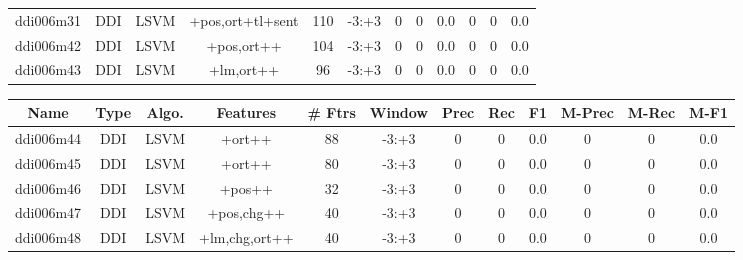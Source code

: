 \documentclass[a4paper]{article}
\begin{document}
\begin{landscape}
\begin{center}
\begin{tabular}{ |c|c|c|c|c|c|c|c|c|c|c|c|}
 
 	
 	\small{ ddi006m31 } & \small{ DDI} & \small{  LSVM }  & +pos,ort+tl+sent  &  110 &  \small{  -3:+3 }  &  0 & 0 & 0.0  &  0 & 0 & 0.0 \\
 	

 
 	
 	\small{ ddi006m42 } & \small{ DDI} & \small{  LSVM }  & +pos,ort++  &  104 &  \small{  -3:+3 }  &  0 & 0 & 0.0  &  0 & 0 & 0.0 \\
 	

 
 	
 	\small{ ddi006m43 } & \small{ DDI} & \small{  LSVM }  & +lm,ort++  &  96 &  \small{  -3:+3 }  &  0 & 0 & 0.0  &  0 & 0 & 0.0 \\
 	
 \hline
\end{tabular}
\end{center}




\begin{center}
\begin{tabular}{ |c|c|c|c|c|c|c|c|c|c|c|c|} 
 \hline
 	Name & Type & Algo. & Features & \# Ftrs & Window & Prec & Rec & F1 & M-Prec & M-Rec & M-F1\\
 \hline

 	

 
 	
 	\small{ ddi006m44 } & \small{ DDI} & \small{  LSVM }  & +ort++  &  88 &  \small{  -3:+3 }  &  0 & 0 & 0.0  &  0 & 0 & 0.0 \\
 	

 
 	
 	\small{ ddi006m45 } & \small{ DDI} & \small{  LSVM }  & +ort++  &  80 &  \small{  -3:+3 }  &  0 & 0 & 0.0  &  0 & 0 & 0.0 \\
 	

 
 	
 	\small{ ddi006m46 } & \small{ DDI} & \small{  LSVM }  & +pos++  &  32 &  \small{  -3:+3 }  &  0 & 0 & 0.0  &  0 & 0 & 0.0 \\
 	

 
 	
 	\small{ ddi006m47 } & \small{ DDI} & \small{  LSVM }  & +pos,chg++  &  40 &  \small{  -3:+3 }  &  0 & 0 & 0.0  &  0 & 0 & 0.0 \\
 	

 
 	
 	\small{ ddi006m48 } & \small{ DDI} & \small{  LSVM }  & +lm,chg,ort++  &  40 &  \small{  -3:+3 }  &  0 & 0 & 0.0  &  0 & 0 & 0.0 \\
 	


\end{tabular}
\end{center}
\end{landscape}
\end{document}
